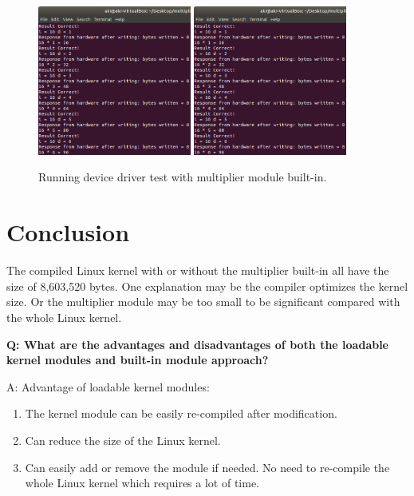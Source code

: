 \documentclass[11pt,letterpaper,titlepage]{article}
\begin{document}
\begin{figure}[ht]
    \centering
    \includegraphics[width=0.45\textwidth]{15.recompiled devtest.png}
    \includegraphics[width=0.45\textwidth]{15.recompiled devtest.png}
    \caption{Running device driver test with multiplier module built-in.}
\end{figure}



\newpage

\part{Conclusion}

The compiled Linux kernel with or without the multiplier built-in all have the size of 8,603,520 bytes. One explanation may be the compiler optimizes the kernel size. Or the multiplier module may be too small to be significant compared with the whole Linux kernel.

\textbf{Q: What are the advantages and disadvantages of both the loadable kernel modules and
built-in module approach?}

A: Advantage of loadable kernel modules:

\begin{enumerate}
    
    \item The kernel module can be easily re-compiled after modification.
    
    \item Can reduce the size of the Linux kernel.
    
    \item Can easily add or remove the module if needed. No need to re-compile the whole Linux kernel which requires a lot of time.
    
\end{enumerate}
\end{document}
